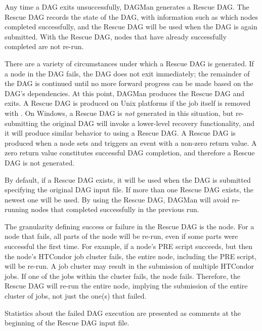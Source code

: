 Any time a DAG exits unsuccessfully, DAGMan generates a Rescue DAG.  
The Rescue DAG records the state of the DAG, 
with information such as which nodes completed successfully,
and the Rescue DAG will be used when the DAG is again submitted.
With the Rescue DAG,
nodes that have already successfully completed are not re-run.

There are a variety of circumstances under which a Rescue DAG
is generated.
If a node in the DAG fails, the DAG does not exit immediately;
the remainder of the DAG is continued until no more forward
progress can be made based on the DAG's dependencies.
At this point, DAGMan produces the Rescue DAG and exits.
A Rescue DAG is produced on Unix platforms if the
 job itself is removed with .
On Windows, a Rescue DAG is \emph{not} generated in this situation,
but re-submitting the original DAG will invoke a lower-level 
recovery functionality,
and it will produce similar behavior to using a Rescue DAG.
A Rescue DAG is produced when a node sets and triggers
an  event with a non-zero return value.
A zero return value constitutes successful DAG completion, 
and therefore a Rescue DAG is not generated.

By default, if a Rescue DAG exists, it will be used when the DAG
is submitted specifying the original DAG input file.  
If more than one Rescue DAG exists, 
the newest one will be used.  
By using the Rescue DAG,
DAGMan will avoid re-running nodes that completed successfully
in the previous run.

The granularity defining success or failure
in the Rescue DAG is the node.
For a node that fails,
all parts of the node will be re-run,
even if some parts were successful the first time.
For example, if a node's PRE script
succeeds, but then the node's HTCondor job cluster fails,
the entire node, including the PRE script, will be re-run.
A job cluster may result in the submission of multiple HTCondor jobs.
If one of the jobs within the cluster fails, the node fails.
Therefore, the Rescue DAG will re-run the entire node,
implying the submission of the entire cluster of jobs,
not just the one(s) that failed.

Statistics about the failed DAG execution are presented as
comments at the beginning of the Rescue DAG input file.

